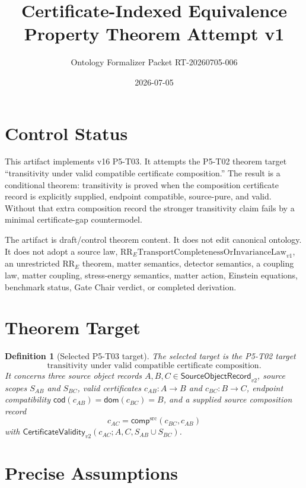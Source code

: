 \documentclass[11pt]{article}
\title{Certificate-Indexed Equivalence Property Theorem Attempt v1}
\author{Ontology Formalizer Packet RT-20260705-006}
\date{2026-07-05}
\newcommand{\ObjRec}{\mathsf{SourceObjectRecord}_{v2}}
\newcommand{\ValidTwo}{\mathsf{CertificateValidity}_{v2}}
\newcommand{\Cdom}{\mathsf{dom}}
\newcommand{\Ccod}{\mathsf{cod}}
\newcommand{\CComp}{\mathsf{comp}^{\mathrm{src}}}
\newcommand{\RRE}{\mathrm{RR}_{E}}
\newcommand{\RRELaw}{\mathrm{RR}_{E}\mathrm{TransportCompletenessOrInvarianceLaw}_{v1}}
\newtheorem{definition}{Definition}
\begin{document}
\maketitle

\section{Control Status}

This artifact implements v16 P5-T03. It attempts the P5-T02 theorem target
``transitivity under valid compatible certificate composition.'' The result is
a conditional theorem: transitivity is proved when the composition certificate
record is explicitly supplied, endpoint compatible, source-pure, and valid.
Without that extra composition record the stronger transitivity claim fails
by a minimal certificate-gap countermodel.

The artifact is draft/control theorem content. It does not edit canonical
ontology. It does not adopt a source law, \(\RRELaw\), an unrestricted
\(\RRE\) theorem, matter semantics, detector semantics, a coupling law, matter
coupling, stress-energy semantics, matter action, Einstein equations,
benchmark status, Gate Chair verdict, or completed derivation.

\section{Theorem Target}

\begin{definition}[Selected P5-T03 target]
The selected target is the P5-T02 target
\[
  \text{transitivity under valid compatible certificate composition}.
\]
It concerns three source object records \(A,B,C\in\ObjRec\), source scopes
\(S_{AB}\) and \(S_{BC}\), valid certificates \(c_{AB}:A\to B\) and
\(c_{BC}:B\to C\), endpoint compatibility
\(\Ccod(c_{AB})=\Cdom(c_{BC})=B\), and a supplied source composition record
\[
  c_{AC}=\CComp(c_{BC},c_{AB})
\]
with \(\ValidTwo(c_{AC};A,C,S_{AB}\cup S_{BC})\).
\end{definition}

\section{Precise Assumptions}
\end{document}

